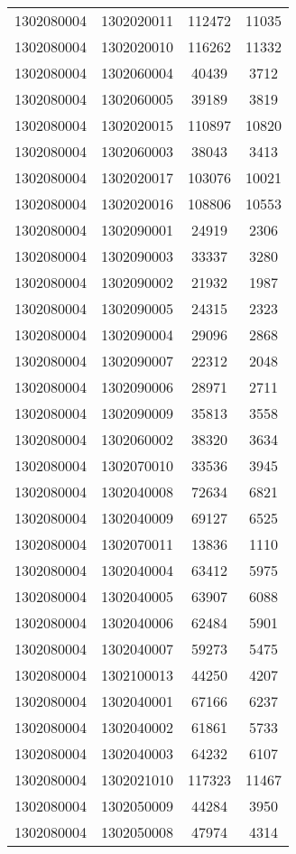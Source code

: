 \begin{longtable}{llcc}
1302080004 & 1302020011 & 112472 & 11035\\
1302080004 & 1302020010 & 116262 & 11332\\
1302080004 & 1302060004 & 40439 & 3712\\
1302080004 & 1302060005 & 39189 & 3819\\
1302080004 & 1302020015 & 110897 & 10820\\
1302080004 & 1302060003 & 38043 & 3413\\
1302080004 & 1302020017 & 103076 & 10021\\
1302080004 & 1302020016 & 108806 & 10553\\
1302080004 & 1302090001 & 24919 & 2306\\
1302080004 & 1302090003 & 33337 & 3280\\
1302080004 & 1302090002 & 21932 & 1987\\
1302080004 & 1302090005 & 24315 & 2323\\
1302080004 & 1302090004 & 29096 & 2868\\
1302080004 & 1302090007 & 22312 & 2048\\
1302080004 & 1302090006 & 28971 & 2711\\
1302080004 & 1302090009 & 35813 & 3558\\
1302080004 & 1302060002 & 38320 & 3634\\
1302080004 & 1302070010 & 33536 & 3945\\
1302080004 & 1302040008 & 72634 & 6821\\
1302080004 & 1302040009 & 69127 & 6525\\
1302080004 & 1302070011 & 13836 & 1110\\
1302080004 & 1302040004 & 63412 & 5975\\
1302080004 & 1302040005 & 63907 & 6088\\
1302080004 & 1302040006 & 62484 & 5901\\
1302080004 & 1302040007 & 59273 & 5475\\
1302080004 & 1302100013 & 44250 & 4207\\
1302080004 & 1302040001 & 67166 & 6237\\
1302080004 & 1302040002 & 61861 & 5733\\
1302080004 & 1302040003 & 64232 & 6107\\
1302080004 & 1302021010 & 117323 & 11467\\
1302080004 & 1302050009 & 44284 & 3950\\
1302080004 & 1302050008 & 47974 & 4314\\

\end{longtable}
